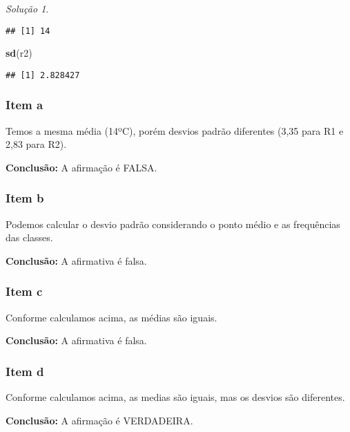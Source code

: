 \documentclass[
]{latex/krantz}
\newenvironment{Shaded}{\begin{snugshade}}{\end{snugshade}}
\newcommand{\FunctionTok}[1]{\textcolor[rgb]{0.13,0.29,0.53}{\textbf{#1}}}
\newcommand{\NormalTok}[1]{#1}
\theoremstyle{definition}
\theoremstyle{definition}
\theoremstyle{definition}
\theoremstyle{definition}
\theoremstyle{remark}
\newtheorem*{solution}{Solução}
\begin{document}
\begin{solution}
\begin{verbatim}
## [1] 14
\end{verbatim}

\begin{Shaded}
\begin{Highlighting}[]
\FunctionTok{sd}\NormalTok{(r2)}
\end{Highlighting}
\end{Shaded}

\begin{verbatim}
## [1] 2.828427
\end{verbatim}

\hypertarget{item-a-1}{%
\subsubsection*{Item a}\label{item-a-1}}

Temos a mesma média (14ºC), porém desvios padrão diferentes (3,35 para R1 e 2,83 para R2).

\textbf{Conclusão:} A afirmação é FALSA.

\hypertarget{item-b-1}{%
\subsubsection*{Item b}\label{item-b-1}}

Podemos calcular o desvio padrão considerando o ponto médio e as frequências das classes.

\textbf{Conclusão:} A afirmativa é falsa.

\hypertarget{item-c-1}{%
\subsubsection*{Item c}\label{item-c-1}}

Conforme calculamos acima, as médias são iguais.

\textbf{Conclusão:} A afirmativa é falsa.

\hypertarget{item-d-1}{%
\subsubsection*{Item d}\label{item-d-1}}

Conforme calculamos acima, as medias são iguais, mas os desvios são diferentes.

\textbf{Conclusão:} A afirmação é VERDADEIRA.
\end{solution}
\end{document}
